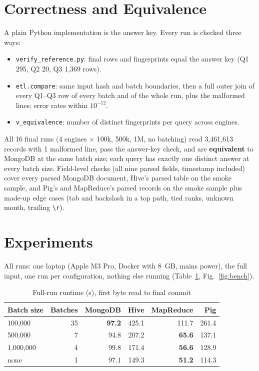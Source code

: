 \documentclass[conference]{IEEEtran}
\newcommand{\code}[1]{\texttt{\small #1}}
\begin{document}
\section{Correctness and Equivalence}
A plain Python implementation is the answer key. Every run is checked three ways:
\begin{itemize}
\item \code{verify\_reference.py}: final rows and fingerprints equal the answer key
  (Q1 295, Q2 20, Q3 1,369 rows).
\item \code{etl.compare}: same input hash and batch boundaries, then a full outer join of every
  Q1--Q3 row of every batch and of the whole run, plus the malformed lines; error rates within
  $10^{-12}$.
\item \code{v\_equivalence}: number of distinct fingerprints per query across engines.
\end{itemize}
All 16 final runs (4 engines $\times$ 100k, 500k, 1M, no batching) read 3,461,613 records with
1 malformed line, pass the answer-key check, and are \textbf{equivalent} to MongoDB at the same
batch size; each query has exactly one distinct answer at every batch size. Field-level checks
(all nine parsed fields, timestamp included) cover every parsed MongoDB document, Hive's parsed
table on the smoke sample, and Pig's and MapReduce's parsed records on the smoke sample plus made-up
edge cases (tab and backslash in a top path, tied ranks, unknown month, trailing \code{\textbackslash r}).

\section{Experiments}
All runs: one laptop (Apple M3 Pro, Docker with 8~GB, mains power), the full input, one run per
configuration, nothing else running (Table~\ref{tab:runtime}, Fig.~\ref{fig:bench}).

\begin{table}[h]
\caption{Full-run runtime (s), first byte read to final commit}
\label{tab:runtime}
\centering
\small
\begin{tabular}{@{}lrrrrr@{}}
\toprule
Batch size & Batches & MongoDB & Hive & MapReduce & Pig \\
\midrule
100,000 & 35 & \textbf{97.2} & 425.1 & 111.7 & 261.4 \\
500,000 & 7 & 94.8 & 207.2 & \textbf{65.6} & 137.1 \\
1,000,000 & 4 & 99.8 & 171.4 & \textbf{56.6} & 128.9 \\
none & 1 & 97.1 & 149.3 & \textbf{51.2} & 114.3 \\
\bottomrule
\end{tabular}
\end{table}
\end{document}
